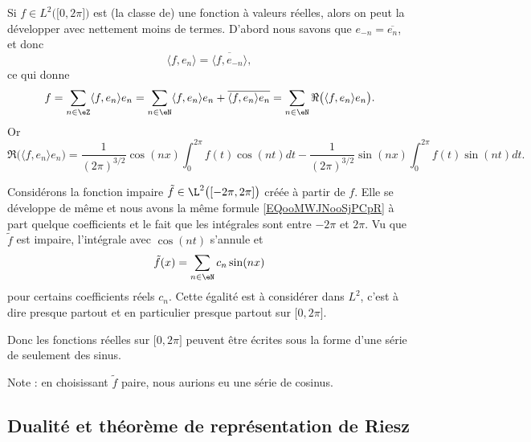 \begin{example}     \label{EXooQDWUooLtuIOm}
    Si \( f\in L^2\big( \mathopen[ 0 , 2\pi \mathclose] \big)\) est (la classe de) une fonction à valeurs réelles, alors on peut la développer avec nettement moins de termes. D'abord nous savons que \( e_{-n}=\overline{ e_n }\), et donc
    \begin{equation}
        \langle f, e_n\rangle =\overline{ \langle f, e_{-n}\rangle  },
    \end{equation}
    ce qui donne
    \begin{equation}
        f=\sum_{n\in\eZ}\langle f, e_n\rangle e_n=\sum_{n\in \eN}\langle f, e_n\rangle e_n +\overline{ \langle f, e_n\rangle e_n }=\sum_{n\in \eN}\Re\big( \langle f, e_n\rangle e_n \big).
    \end{equation}
    Or
    \begin{equation}        \label{EQooMWJNooSjPCpR}
        \Re\big( \langle f, e_n\rangle e_n \big)=\frac{1}{ (2\pi)^{3/2} }\cos(nx)\int_0^{2\pi}f(t)\cos(nt)dt-\frac{1}{ (2\pi)^{3/2} }\sin(nx)\int_0^{2\pi}f(t)\sin(nt)dt.
    \end{equation}

    Considérons la fonction impaire \( \tilde f\in\L^2\big( [-2\pi,2\pi] \big)\) créée à partir de \( f\). Elle se développe de même et nous avons la même formule \eqref{EQooMWJNooSjPCpR} à part quelque coefficients et le fait que les intégrales sont entre \( -2\pi\) et \( 2\pi\). Vu que \( \tilde f\) est impaire, l'intégrale avec \( \cos(nt)\) s'annule et
    \begin{equation}
        \tilde f(x)=\sum_{n\in \eN}c_n\sin(nx)
    \end{equation}
    pour certains coefficients réels \( c_n\). Cette égalité est à considérer dans \( L^2\), c'est à dire presque partout et en particulier presque partout sur \( \mathopen[ 0 , 2\pi \mathclose]\).

    Donc les fonctions réelles sur \( \mathopen[ 0 , 2\pi \mathclose]\) peuvent être écrites sous la forme d'une série de seulement des sinus. 

    Note : en choisissant \( \tilde f\) paire, nous aurions eu une série de cosinus.
\end{example}

\subsection{Dualité et théorème de représentation de Riesz}

